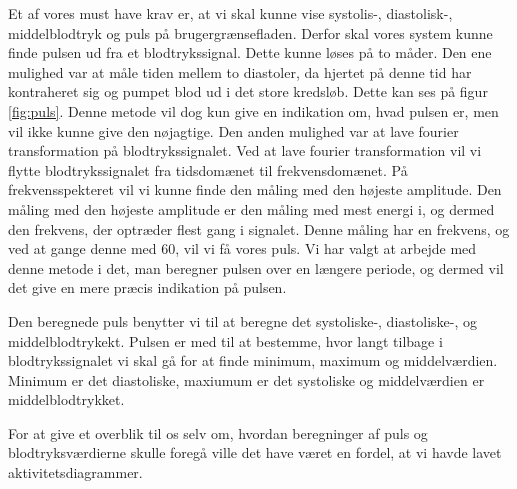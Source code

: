 Et af vores must have krav er, at vi skal kunne vise systolis-, diastolisk-, middelblodtryk og puls på brugergrænsefladen. Derfor skal vores system kunne finde pulsen ud fra et blodtrykssignal. Dette kunne løses på to måder. Den ene mulighed var at måle tiden mellem to diastoler, da hjertet på denne tid har kontraheret sig og pumpet blod ud i det store kredsløb. Dette kan ses på figur \vref{fig:puls}. Denne metode vil dog kun give en indikation om, hvad pulsen er, men vil ikke kunne give den nøjagtige.
Den anden mulighed var at lave fourier transformation på blodtrykssignalet. Ved at lave fourier transformation vil vi flytte blodtrykssignalet fra tidsdomænet til frekvensdomænet. På frekvensspekteret vil vi kunne finde den måling med den højeste amplitude. Den måling med den højeste amplitude er den måling med mest energi i, og dermed den frekvens, der optræder flest gang i signalet. Denne måling har en frekvens, og ved at gange denne med 60, vil vi få vores puls. Vi har valgt at arbejde med denne metode i det, man beregner pulsen over en længere periode, og dermed vil det give en mere præcis indikation på pulsen.

Den beregnede puls benytter vi til at beregne det systoliske-, diastoliske-, og middelblodtrykekt. Pulsen er med til at bestemme, hvor langt tilbage i blodtrykssignalet vi skal gå for at finde minimum, maximum og middelværdien. Minimum er det diastoliske, maxiumum er det systoliske og middelværdien er middelblodtrykket.

For at give et overblik til os selv om, hvordan beregninger af puls og blodtryksværdierne skulle foregå ville det have været en fordel, at vi havde lavet aktivitetsdiagrammer.
